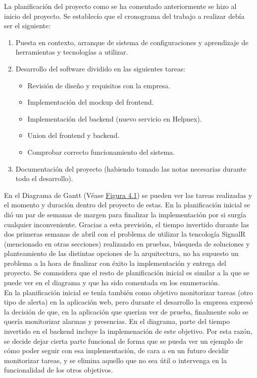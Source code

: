 La planificación del proyecto como se ha comentado anteriormente se hizo al inicio del proyecto. Se establecío que el cronograma del trabajo a realizar debía ser el siguiente:
\begin{enumerate}
    \item Puesta en contexto, arranque de sistema de configuraciones y aprendizaje de herramientas y tecnologías a utilizar.
    \item Desarrollo del software dividido en las siguientes tareas:
    \begin{itemize}
        \item Revisión de diseño y requisitos con la empresa.
        \item Implementación del mockup del frontend.
        \item Implementación del backend (nuevo servicio en Helpnex).
        \item Union del frontend y backend.
        \item Comprobar correcto funcionamiento del sistema.
    \end{itemize}
    \item Documentación del proyecto (habiendo tomado las notas necesarias durante todo el desarrollo).
\end{enumerate}

En el Diagrama de Gantt (Véase \hyperref[fig:gantt]{Figura 4.1}) se pueden ver las tareas realizadas y el momento y duración dentro del proyecto de estas. En la planificación inicial se dió un par de semanas de margen para finalizar la implementación por si surgía cualquier inconveniente. Gracias a esta previsión, el tiempo invertido durante las dos primeras semanas de abril con el problema de utilizar la tencología SignalR (mencionado en otras secciones) realizando en pruebas, búsqueda de soluciones y planteamiento de las distintas opciones de la arquitectura, no ha supuesto un problema a la hora de finalizar con éxito la implementación y entrega del proyecto. Se comnsidera que el resto de planificación inicial es similar a la que se puede ver en el diagrama y que ha sido comentada en los enumeración. \\

En la planificación inicial se tenía también como objetivo monitorizar tareas (otro tipo de alerta) en la aplicación web, pero durante el desarrollo la empresa expresó la decisión de que, en la aplicación que querían ver de prueba, finalmente solo se quería monitorizar alarmas y presencias. En el diagrama, parte del tiempo invertido en el backend incluye la implemenación de este objetivo. Por esta razón, se decide dejar cierta parte funcional de forma que se pueda ver un ejemplo de cómo poder seguir con esa implementación, de cara a en un futuro decidir monitorizar tareas, y se elimina aquello que no sea útil o intervenga en la funcionalidad de los otros objetivos.

